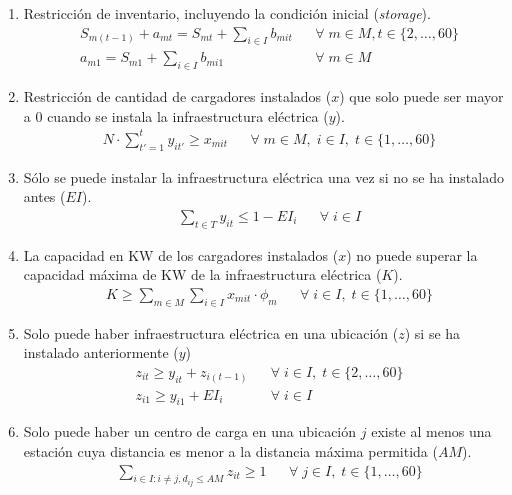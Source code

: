 \documentclass[letterpaper]{article}
\begin{document}
\begin{flushleft}
	\begin{enumerate}
		\item Restricción de inventario, incluyendo la condici\'on inicial (\textit{storage}).
		      \begin{align*}
			       & S_{m(t-1)} + a_{mt} = S_{mt} + \sum_{i \in I} b_{mit} &  & \forall \; m \in M, t \in \{2, \ldots, 60\} \\
			       & a_{m1} = S_{m1} + \sum_{i \in I} b_{mi1}              &  & \forall \; m \in M
		      \end{align*}
		\item Restricción de cantidad de cargadores instalados ($x$) que solo puede ser mayor a $0$ cuando se instala la infraestructura eléctrica ($y$).
		      \begin{align*}
			       & N \cdot \sum_{t'=1}^{t} y_{it'} \geq x_{mit} &  & \forall \; m \in M, \; i \in I,\; t \in \{1, \ldots, 60\}
		      \end{align*}
		\item S\'olo se puede instalar la infraestructura el\'ectrica una vez si no se ha instalado antes ($EI$).
		      \begin{align*}
			       & \sum_{t \in T} y_{it} \leq 1 - EI_i &  & \forall \; i \in I
		      \end{align*}
		\item La capacidad en KW de los cargadores instalados ($x$) no puede superar la capacidad m\'axima de KW de la infraestructura el\'ectrica ($K$).
		      \begin{align*}
			       & K \geq \sum_{m \in M} \sum_{i \in I} x_{mit} \cdot \phi_m &  & \forall \; i \in I, \; t \in \{1, \ldots, 60\}
		      \end{align*}
		\item Solo puede haber infraestructura el\'ectrica en una ubicaci\'on ($z$) si se ha instalado anteriormente ($y$)
		      \begin{align*}
			       & z_{it} \geq y_{it} + z_{i(t-1)} &  & \forall \; i \in I, \;t \in \{2, \ldots, 60\} \\
			       & z_{i1} \geq y_{i1} + EI_i       &  & \forall \; i \in I
		      \end{align*}
		\item Solo puede haber un centro de carga en una ubicaci\'on $j$ existe al menos una estaci\'on cuya distancia es menor a la distancia m\'axima permitida ($AM$).
		      \begin{align*}
			       & \sum_{i \in I: i \neq j, d_{ij}\leq AM} z_{it} \geq 1 &  & \forall \; j \in I, \; t \in \{1, \ldots, 60\}

\end{align*}
\end{enumerate}
\end{flushleft}
\end{document}

